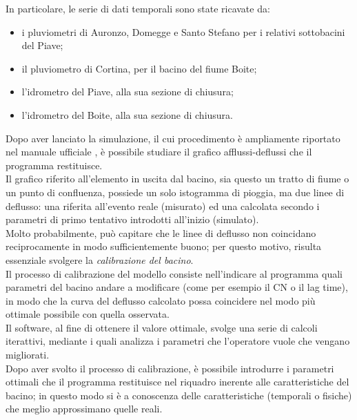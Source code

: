 In particolare, le serie di dati temporali sono state ricavate da:
\begin{itemize}
    \item i pluviometri di Auronzo, Domegge e Santo Stefano per i relativi sottobacini del Piave;
    \item il pluviometro di Cortina, per il bacino del fiume Boite;
    \item l'idrometro del Piave, alla sua sezione di chiusura;
    \item l'idrometro del Boite, alla sua sezione di chiusura.
\end{itemize}
Dopo aver lanciato la simulazione, il cui procedimento è ampliamente riportato nel manuale ufficiale \cite{manual_hec_hms}, è possibile studiare il grafico afflussi-deflussi che il programma restituisce.\\
Il grafico riferito all'elemento in uscita dal bacino, sia questo un tratto di fiume o un punto di confluenza, possiede un solo istogramma di pioggia, ma due linee di deflusso: una riferita all'evento reale (misurato) ed una calcolata secondo i parametri di primo tentativo introdotti all'inizio (simulato).\\
Molto probabilmente, può capitare che le linee di deflusso non coincidano reciprocamente in modo sufficientemente buono; per questo motivo, risulta essenziale svolgere la \textit{calibrazione del bacino}.\\
Il processo di calibrazione del modello consiste nell'indicare al programma quali parametri del bacino andare a modificare (come per esempio il CN o il lag time), in modo che la curva del deflusso calcolato possa coincidere nel modo più ottimale possibile con quella osservata.\\
Il software, al fine di ottenere il valore ottimale, svolge una serie di calcoli iterattivi, mediante i quali analizza i parametri che l'operatore vuole che vengano migliorati.\\
Dopo aver svolto il processo di calibrazione, è possibile introdurre i parametri ottimali che il programma restituisce nel riquadro inerente alle caratteristiche del bacino; in questo modo si è a conoscenza delle caratteristiche (temporali o fisiche) che meglio approssimano quelle reali.
